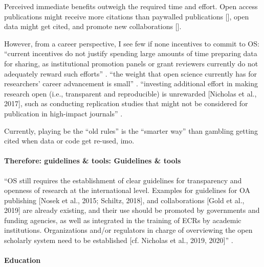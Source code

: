 
Perceived immediate benefits outweigh the required time and effort.
%
Open access publications might receive more citations than paywalled
publications [\citep{piwowar2018state}], open data might
get cited, and promote new collaborations [\citep{popkin2019data}].


However, from a career perspective, I see few if none incentives to commit to
OS:
``current incentives do not justify spending large amounts of time preparing
data for sharing, as institutional promotion panels or grant reviewers currently
do not adequately reward such efforts'' \citep{nichols2017best}.
%
``the weight that open science currently has for researchers' career advancement
is small'' \citep{toribio2021early}.
%
``investing additional effort in making research open (i.e., transparent and
reproducible) is unrewarded [Nicholas et al., 2017], such as conducting
replication studies that might not be considered for publication in high-impact
journals'' \citep{toribio2021early}.

%
Currently, playing be the ``old rules'' is the ``smarter way'' than gambling
getting cited when data or code get re-used, imo.


\paragraph{Therefore: guidelines \& tools: Guidelines \& tools}


%
``OS still requires the establishment of clear guidelines for transparency and
openness of research at the international level.
%
Examples for guidelines for OA publishing [Nosek et al., 2015; Schiltz, 2018],
and collaborations [Gold et al., 2019] are already existing, and their use
should be promoted by governments and funding agencies, as well as integrated in
the training of ECRs by academic institutions.
%
Organizations and/or regulators in charge of overviewing the open scholarly
system need to be established [cf. Nicholas et al., 2019, 2020]''
\citep{toribio2021early}.


\paragraph{Education}

